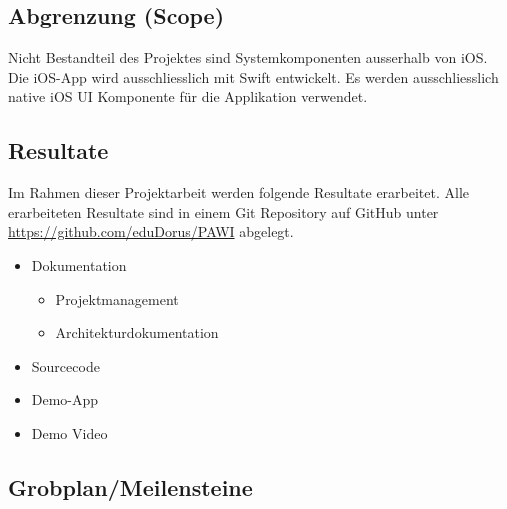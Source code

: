 \subsection{Abgrenzung (Scope)}
Nicht Bestandteil des Projektes sind Systemkomponenten ausserhalb von iOS. Die iOS-App wird ausschliesslich mit Swift entwickelt. Es werden ausschliesslich native iOS UI Komponente für die Applikation verwendet.

\subsection{Resultate}
Im Rahmen dieser Projektarbeit werden folgende Resultate erarbeitet. Alle erarbeiteten Resultate sind in einem Git Repository auf GitHub unter \url{https://github.com/eduDorus/PAWI} abgelegt.
 
\begin{itemize}
    \item Dokumentation
    \begin{itemize}
        \item Projektmanagement
        \item Architekturdokumentation
    \end{itemize}
    \item Sourcecode
    \item Demo-App
    \item Demo Video
\end{itemize}

\subsection{Grobplan/Meilensteine}



